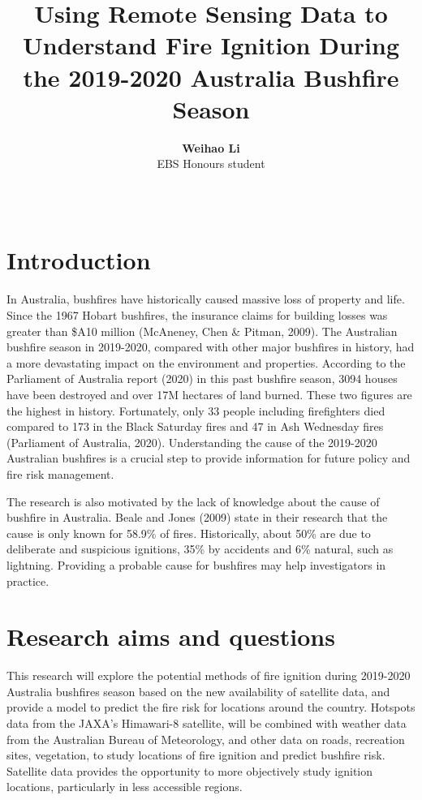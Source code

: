 \documentclass[11pt,a4paper,]{article}
\title{Using Remote Sensing Data to Understand Fire Ignition During the 2019-2020 Australia Bushfire Season}
\author{\sf\Large\textbf{ Weihao Li}\\ {\sf\large EBS Honours student\\[0.5cm]}}
\date{\sf\Date~\Month~\Year}
\makeatletter
\def\titlepage{\front{\expandafter{\@title}}{\@author}{\@organization}}
\makeatother
\begin{document}
\titlepage

\hypertarget{introduction}{%
\section{Introduction}\label{introduction}}

In Australia, bushfires have historically caused massive loss of property and life. Since the 1967 Hobart bushfires, the insurance claims for building losses was greater than \$A10 million (McAneney, Chen \& Pitman, 2009).
The Australian bushfire season in 2019-2020, compared with other major bushfires in history, had a more devastating impact on the environment and properties. According to the Parliament of Australia report (2020) in this past bushfire season, 3094 houses have been destroyed and over 17M hectares of land burned. These two figures are the highest in history. Fortunately, only 33 people including firefighters died compared to 173 in the Black Saturday fires and 47 in Ash Wednesday fires (Parliament of Australia, 2020).
Understanding the cause of the 2019-2020 Australian bushfires is a crucial step to provide information for future policy and fire risk management.

The research is also motivated by the lack of knowledge about the cause of bushfire in Australia. Beale and Jones (2009) state in their research that the cause is only known for 58.9\% of fires. Historically, about 50\% are due to deliberate and suspicious ignitions, 35\% by accidents and 6\% natural, such as lightning. Providing a probable cause for bushfires may help investigators in practice.

\hypertarget{research-aims-and-questions}{%
\section{Research aims and questions}\label{research-aims-and-questions}}

This research will explore the potential methods of fire ignition during 2019-2020 Australia bushfires season based on the new availability of satellite data, and provide a model to predict the fire risk for locations around the country. Hotspots data from the JAXA's Himawari-8 satellite, will be combined with weather data from the Australian Bureau of Meteorology, and other data on roads, recreation sites, vegetation, to study locations of fire ignition and predict bushfire risk. Satellite data provides the opportunity to more objectively study ignition locations, particularly in less accessible regions.
\end{document}
